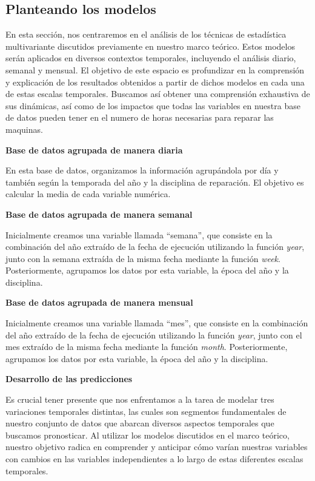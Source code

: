 \documentclass[
  11pt,
  bookmarksnumbered]{article}
\begin{document}
\newpage

\hypertarget{planteando-los-modelos}{%
\subsection{Planteando los modelos}\label{planteando-los-modelos}}

En esta sección, nos centraremos en el análisis de los técnicas de estadística multivariante discutidos previamente en nuestro marco teórico.
Estos modelos serán aplicados en diversos contextos temporales, incluyendo el análisis diario, semanal y mensual.
El objetivo de este espacio es profundizar en la comprensión y explicación de los resultados obtenidos a partir de dichos modelos en cada una de estas escalas temporales.
Buscamos así obtener una comprensión exhaustiva de sus dinámicas, así como de los impactos que todas las variables en nuestra base de datos pueden tener en el numero de horas necesarias para reparar las maquinas.

\textbf{Base de datos agrupada de manera diaria}

En esta base de datos, organizamos la información agrupándola por día y también según la temporada del año y la disciplina de reparación.
El objetivo es calcular la media de cada variable numérica.

\textbf{Base de datos agrupada de manera semanal}

Inicialmente creamos una variable llamada ``semana'', que consiste en la combinación del año extraído de la fecha de ejecución utilizando la función \emph{year}, junto con la semana extraída de la misma fecha mediante la función \emph{week}.
Posteriormente, agrupamos los datos por esta variable, la época del año y la disciplina.

\textbf{Base de datos agrupada de manera mensual}

Inicialmente creamos una variable llamada ``mes'', que consiste en la combinación del año extraído de la fecha de ejecución utilizando la función \emph{year}, junto con el mes extraído de la misma fecha mediante la función \emph{month}.
Posteriormente, agrupamos los datos por esta variable, la época del año y la disciplina.

\textbf{Desarrollo de las predicciones}

Es crucial tener presente que nos enfrentamos a la tarea de modelar tres variaciones temporales distintas, las cuales son segmentos fundamentales de nuestro conjunto de datos que abarcan diversos aspectos temporales que buscamos pronosticar.
Al utilizar los modelos discutidos en el marco teórico, nuestro objetivo radica en comprender y anticipar cómo varían nuestras variables con cambios en las variables independientes a lo largo de estas diferentes escalas temporales.
\end{document}
